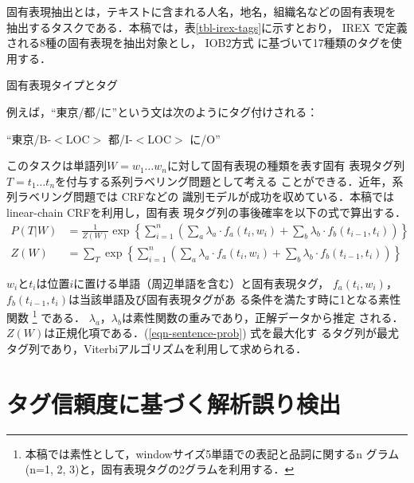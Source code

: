 \documentclass[japanese]{jnlp_1.4}
\begin{document}
固有表現抽出とは，テキストに含まれる人名，地名，組織名などの固有表現を
抽出するタスクである．本稿では，表\ref{tbl-irex-tags}に示すとおり，
IREX \cite{IREX1999}で定義される8種の固有表現を抽出対象とし，
IOB2方式\cite{Sang:IOB1999} に基づいて17種類のタグを使用する．


\begin{table}[b]
\caption{固有表現タイプとタグ}
\label{tbl-irex-tags}

\end{table}


例えば，``東京/都/に''という文は次のようにタグ付けされる：

\begin{center}
``東京/B-$<$LOC$>$ 都/I-$<$LOC$>$ に/O''
\end{center}


このタスクは単語列$W = w_1 \ldots w_n$に対して固有表現の種類を表す固有
表現タグ列$T = t_1 \ldots t_n$を付与する系列ラベリング問題として考える
ことができる．近年，系列ラベリング問題では
CRF\cite{Lafferty:CRF2001,suzuki-mcdermott-isozaki:2006:COLACL}などの
識別モデルが成功を収めている．本稿ではlinear-chain CRFを利用し，固有表
現タグ列の事後確率を以下の式で算出する．
\begin{align}
P(T|W) & =  \frac{1}{Z(W)} 
\exp \left\{ \sum_{i=1}^{n} \left( \sum_{a} \lambda_{a} \cdot f_{a}(t_i,w_i) +
\sum_{b} \lambda_{b} \cdot f_{b}(t_{i-1},t_{i}) \right) \right\} 
\label{eqn-sentence-prob}\\
Z(W) & =  \sum_{T}
\exp \left\{ \sum_{i=1}^{n} \left( \sum_{a} \lambda_{a} \cdot f_{a}(t_i,w_i) +
\sum_{b} \lambda_{b} \cdot f_{b}(t_{i-1},t_{i}) \right) \right\}
\end{align}

$w_i$と$t_i$は位置$i$に置ける単語（周辺単語を含む）と固有表現タグ，
$f_{a}(t_i,w_i)$，$f_{b}(t_{i-1},t_{i})$は当該単語及び固有表現タグがあ
る条件を満たす時に1となる素性関数
\footnote{本稿では素性として，windowサイズ5単語での表記と品詞に関するn 
グラム (n=1, 2, 3)と，固有表現タグの2グラムを利用する．} である．
$\lambda_{a}$，$\lambda_{b}$は素性関数の重みであり，正解データから推定
される．$Z(W)$は正規化項である．(\ref{eqn-sentence-prob}) 式を最大化す
るタグ列が最尤タグ列であり，Viterbiアルゴリズムを利用して求められる．



\section{タグ信頼度に基づく解析誤り検出}
\label{sec-confidence-measure}
\end{document}
